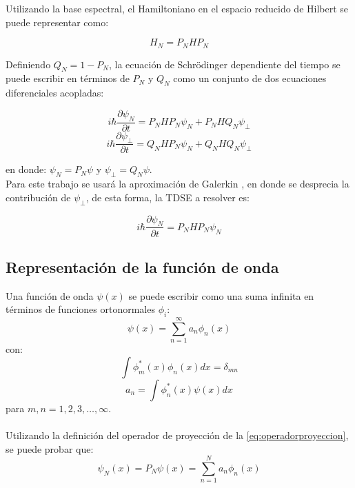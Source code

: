 Utilizando la base espectral, el Hamiltoniano en el espacio reducido de Hilbert se puede representar como:

\begin{equation}
  \label{eq:Hamiltonianored}
  H_N = P_NHP_N
\end{equation}

Definiendo $Q_N = 1-P_N$, la ecuación de Schrödinger dependiente del tiempo se puede escribir en términos de $P_N$ y $Q_N$ como un conjunto de dos ecuaciones diferenciales acopladas:

\begin{equation}
  \label{eq:acopladas1}
  i\hbar\frac{\partial \psi_N}{\partial t} = P_NHP_N\psi_N + P_NHQ_N\psi_{\perp}
\end{equation}
\begin{equation}
  \label{eq:acopladas2}
  i\hbar\frac{\partial \psi_{\perp}}{\partial t} = Q_NHP_N\psi_N + Q_NHQ_N\psi_{\perp}
\end{equation}


en donde: $\psi_N = P_N\psi$ y $\psi_{\perp}=Q_N\psi$.
\\

Para este trabajo se usará la aproximación de Galerkin \cite{Gottlieb}, en donde se desprecia la contribución de $\psi_{\perp}$, de esta forma, la \acs{TDSE} a resolver es:
\begin{tcolorbox}[colback=CTtitle!5!white,colframe=CTtitle!85!white]%
\begin{equation}
\label{eq:TDSEN}
i\hbar \frac{\partial \psi_N}{\partial t} = P_NHP_N\psi_N
\end{equation}
\end{tcolorbox}

\subsection{Representación de la función de onda}

Una función de onda $\psi(x)$ se puede escribir como una suma infinita en términos de funciones ortonormales $\phi_i$:
\begin{equation}
  \label{eq:wavefuninf}
  \psi(x) = \sum_{n=1}^{\infty}a_n\phi_n(x)
\end{equation}
con:
\[ \int \phi_m^*(x)\phi_n(x)dx = \delta_{mn} \]
\[ a_n = \int \phi_n^*(x)\psi(x)dx\]
para $m,n=1,2,3,\dots, \infty$.
\\
\\
Utilizando la definición del operador de proyección de la \autoref{eq:operadorproyeccion}, se puede probar que:
\begin{equation}
  \label{eq:wavepacketinit}
  \psi_N(x) = P_N\psi(x)=\sum_{n=1}^{N}a_n\phi_n(x)
\end{equation}

